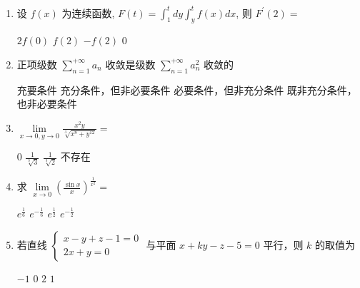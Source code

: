 \begin{enumerate}
\begin{enumerate}
\fourchoices
{$\frac{\sqrt{3}}{2}$}
{$ 1 $}
{$\frac{\sqrt{2}}{2}$}
{$\frac{1}{6}$}

\item
设 $f(x)$ 为连续函数, $F(t)=\int_{1}^{t} d y \int_{y}^{t} f(x) d x$, 则 $F^{\prime}(2)=$ 


\fourchoices
{$2 f(0)$}
{$f(2)$}
{$-f(2)$}
{$ 0 $}

\item
正项级数 $\sum\limits_{n=1}^{+\infty} a_{n} $ 收敛是级数 $\sum\limits_{n=1}^{+\infty} a_{n}^{2} $ 收敛的 


\fourchoices
{充要条件}
{充分条件，但非必要条件}
{必要条件，但非充分条件}
{既非充分条件，也非必要条件}

\item
$ \lim\limits _{x \rightarrow 0, y \rightarrow 0} \frac{x^{2} y}{\sqrt[3]{x^{8}+y^{12}}}= $ 


\fourchoices
{$ 0 $}
{$\frac{1}{\sqrt[3]{3}}$}
{$\frac{1}{\sqrt[3]{2}}$}
{不存在}

\item
求 $\lim\limits _{x \rightarrow 0}\left(\frac{\sin x}{x}\right)^{\frac{1}{x^{2}}}=$ 


\fourchoices
{$e^{\frac{1}{6}}$}
{$e^{-\frac{1}{6}}$}
{$e^{\frac{1}{2}}$}
{$e^{-\frac{1}{2}}$}

\item
若直线 $\left\{\begin{array}{l}x-y+z-1=0 \\ 2 x+y=0\end{array}\right.$ 与平面 $x+k y-z-5=0$ 平行，则 $k$ 的取值为 


\fourchoices
{$ -1 $}
{$ 0 $}
{$ 2 $}
{$ 1 $}





	\end{enumerate}


\end{enumerate}
